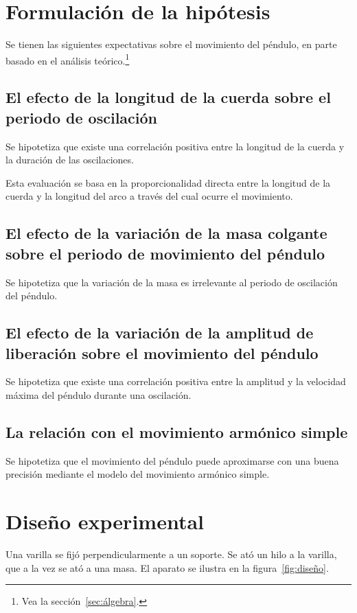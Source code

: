 \documentclass[twocolumn]{article}
\numberwithin{table}{section}
\begin{document}
\section{Formulación de la hipótesis}
Se tienen las siguientes expectativas sobre el movimiento del péndulo,
en parte basado en el análisis teórico.\footnote{Vea la
sección~\ref{sec:álgebra}.}

\subsection*{El efecto de la longitud de la cuerda sobre el
periodo de oscilación}
Se hipotetiza que existe una correlación positiva entre la longitud
de la cuerda y la duración de las oscilaciones.

Esta evaluación se basa en la proporcionalidad directa entre la
longitud de la cuerda y la longitud del arco a través del cual ocurre
el movimiento.

\subsection*{El efecto de la variación de la masa colgante sobre
el periodo de movimiento del péndulo}

Se hipotetiza que la variación de la masa es irrelevante al periodo
de oscilación del péndulo.

\subsection*{El efecto de la variación de la amplitud de liberación
sobre el movimiento del péndulo}

Se hipotetiza que existe una correlación positiva entre la amplitud y
la velocidad máxima del péndulo durante una oscilación.

\subsection*{La relación con el movimiento armónico simple}
Se hipotetiza que el movimiento del péndulo puede aproximarse con una
buena precisión mediante el modelo del movimiento armónico simple.

\section{Diseño experimental}

Una varilla se fijó perpendicularmente a un soporte. Se ató un hilo a
la varilla, que a la vez se ató a una masa. El aparato se ilustra en la
figura~\ref{fig:diseño}.
\end{document}
